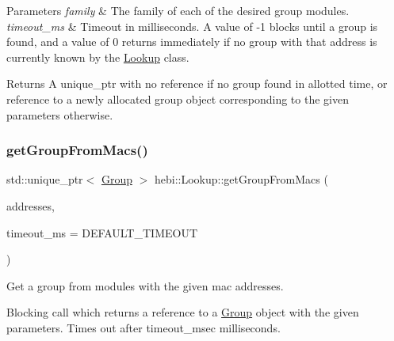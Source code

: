 \begin{DoxyParams}{Parameters}
{\em family} & The family of each of the desired group modules. \\
\hline
{\em timeout\+\_\+ms} & Timeout in milliseconds. A value of -\/1 blocks until a group is found, and a value of 0 returns immediately if no group with that address is currently known by the \hyperlink{classhebi_1_1Lookup}{Lookup} class. \\
\hline
\end{DoxyParams}
\begin{DoxyReturn}{Returns}
A unique\+\_\+ptr with no reference if no group found in allotted time, or reference to a newly allocated group object corresponding to the given parameters otherwise. 
\end{DoxyReturn}
\mbox{\label{classhebi_1_1Lookup_aad6bf0015b82dbce0b4dde06e1b10f52}} 
\subsubsection{\texorpdfstring{get\+Group\+From\+Macs()}{getGroupFromMacs()}}
{\footnotesize\ttfamily std\+::unique\+\_\+ptr$<$ \hyperlink{classhebi_1_1Group}{Group} $>$ hebi\+::\+Lookup\+::get\+Group\+From\+Macs (\begin{DoxyParamCaption}\item[{const std\+::vector$<$ \hyperlink{classhebi_1_1MacAddress}{Mac\+Address} $>$ \&}]{addresses,  }\item[{long}]{timeout\+\_\+ms = {\ttfamily DEFAULT\+\_\+TIMEOUT} }\end{DoxyParamCaption})}



Get a group from modules with the given mac addresses. 

Blocking call which returns a reference to a \hyperlink{classhebi_1_1Group}{Group} object with the given parameters. Times out after timeout\+\_\+msec milliseconds.


